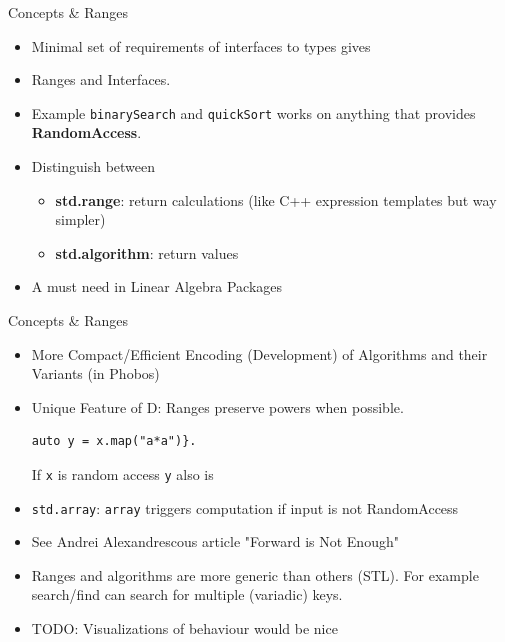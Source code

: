\documentclass[xcolor=dvipsnames]{beamer}
\begin{document}
\begin{frame}[fragile]{Concepts \& Ranges}
  \begin{itemize}[<+->]
  \item Minimal set of requirements of interfaces to types gives
  \item Ranges and Interfaces.
  \item Example \texttt{binarySearch} and \texttt{quickSort} works on anything
    that provides \textbf{RandomAccess}.
  \item Distinguish between
    \begin{itemize}[<+->]
    \item \textbf{std.range}: return calculations (like C++ expression templates
      but way simpler)
    \item \textbf{std.algorithm}: return values
    \end{itemize}
  \item A must need in Linear Algebra Packages
  \end{itemize}
\end{frame}

\begin{frame}[fragile]{Concepts \& Ranges}
  \begin{itemize}[<+->]
  \item More Compact/Efficient Encoding (Development) of Algorithms and their
    Variants (in Phobos)
  \item Unique Feature of D: Ranges preserve powers when possible.
    \begin{lstlisting}[frame=single]
auto y = x.map("a*a")}.
    \end{lstlisting}
      If \texttt{x} is random access \texttt{y} also is
  \item \texttt{std.array}: \texttt{array} triggers computation if input is not RandomAccess
  \item See Andrei Alexandrescous article "Forward is Not Enough"
  \item Ranges and algorithms are more generic than others (STL). For example
    search/find can search for multiple (variadic) keys.
  \item TODO: Visualizations of behaviour would be nice
  \end{itemize}
\end{frame}
\end{document}
